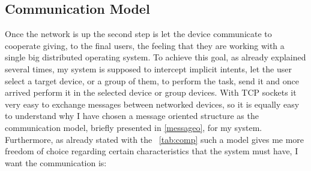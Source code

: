 \subsection{Communication Model}
 Once the network is up the second step is let the device communicate to cooperate giving, to the final users, the feeling that they are working with a single big distributed operating system. To achieve this goal, as already explained several times, my system is supposed to intercept implicit intents, let the user select a target device, or a group of them, to perform the task, send it and once arrived perform it in the selected device or group devices. With TCP sockets it very easy to exchange messages between networked devices, so it is equally easy to understand why I have chosen a message oriented structure as the communication model, briefly presented in \ref{messageo}, for my system. Furthermore, as already stated with the \tablename~\ref{tab:comp} such a model gives me more freedom of choice regarding certain characteristics that the system must have, I want the communication is:
